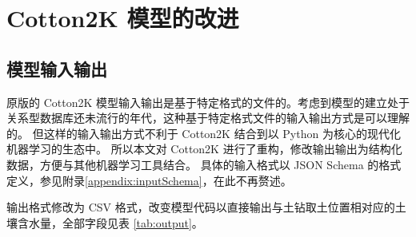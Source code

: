 \chapter{Cotton2K 模型的改进}\label{chap:modelModification}

\section{模型输入输出}\label{sec:io}

原版的 Cotton2K 模型输入输出是基于特定格式的文件的。考虑到模型的建立处于关系型数据库还未流行的年代，这种基于特定格式文件的输入输出方式是可以理解的。
但这样的输入输出方式不利于 Cotton2K 结合到以 Python 为核心的现代化机器学习的生态中。
所以本文对 Cotton2K 进行了重构，修改输出输出为结构化数据，方便与其他机器学习工具结合。
具体的输入格式以 JSON Schema 的格式定义，参见附录\ref{appendix:inputSchema}，在此不再赘述。

输出格式修改为 CSV 格式，改变模型代码以直接输出与土钻取土位置相对应的土壤含水量，全部字段见表 \ref{tab:output}。

